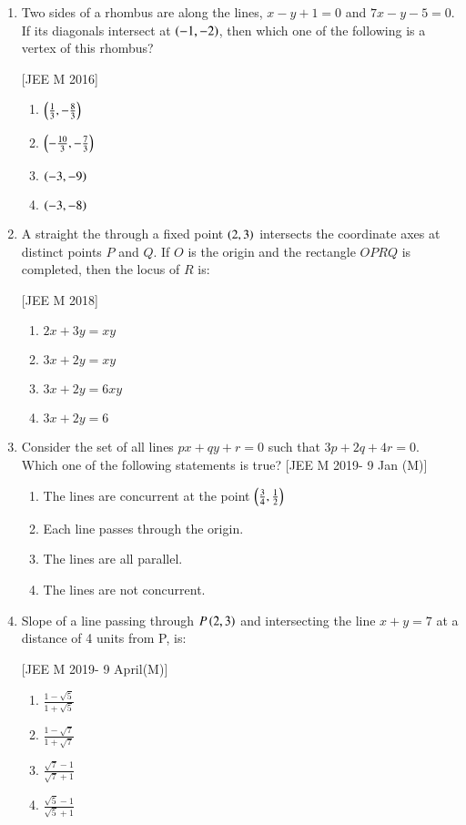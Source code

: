 \documentclass[journal,12pt,twocolumn]{IEEEtran}
\theoremstyle{remark}
\begin{document}
\begin{enumerate}
\item Two sides of a rhombus are along the lines, $x-y+1=0$ and 
$7x-y-5=0$. If its diagonals intersect at $\left(-1, -2\right)$, then which one of the following is a vertex of this rhombus?

\hfill{[JEE M 2016]}
\begin{multicols}{2}
\begin{enumerate}[label=(\alph*)]
\item $\left(\frac{1}{3}, -\frac{8}{3}\right)$
\item $\left(-\frac{10}{3}, -\frac{7}{3}\right)$
\item $\left(-3, -9\right)$
\item $\left(-3, -8\right)$
\end{enumerate}
\end{multicols}

\item A straight the through a fixed point $\left(2, 3\right)$ intersects the 
coordinate axes at distinct points $P$ and $Q$. If $O$ is the origin 
and the rectangle $OPRQ$ is completed, then the locus of $R$ is: 

\hfill{[JEE M 2018]}
\begin{multicols}{2}
\begin{enumerate}[label=(\alph*)]
\item $2x+3y = xy$
\item $3x+2y = xy$ 
\item $3x+2y = 6xy$ 
\item $3x+2y = 6$
\end{enumerate}
\end{multicols}

\item Consider the set of all lines $px+qy+r=0$ such that 
$3p+2q+4r=0$. Which one of the following statements is true? \hfill{[JEE M 2019- 9 Jan (M)]}
\begin{enumerate}[label=(\alph*)]
\item The lines are concurrent at the point $\left(\frac{3}{4}, \frac{1}{2}\right)$
\item Each line passes through the origin. 
\item The lines are all parallel.
\item The lines are not concurrent.
\end{enumerate}

\item Slope of a line passing through $P\left(2, 3\right)$ and intersecting the line $x+y=7$ at a distance of 4 units from P, is:

\hfill{[JEE M 2019- 9 April(M)]}
\begin{multicols}{2}
\begin{enumerate}[label=(\alph*)]
\item $\frac{1-\sqrt{5}}{1+\sqrt{5}}$
\item $\frac{1-\sqrt{7}}{1+\sqrt{7}}$
\item $\frac{\sqrt{7}-1}{\sqrt{7}+1}$
\item $\frac{\sqrt{5}-1}{\sqrt{5}+1}$
\end{enumerate}
\end{multicols}

\end{enumerate}
\end{document}
